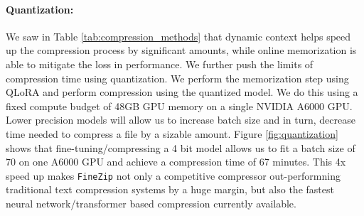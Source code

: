 \documentclass[11pt]{article}
\begin{document}
\paragraph{Quantization:} We saw in Table \ref{tab:compression_methods} that dynamic context helps speed up the compression process by significant amounts, while online memorization is able to mitigate the loss in performance. We further push the limits of compression time using quantization. We perform the memorization step using QLoRA \cite{dettmers2023qlora} and perform compression using the quantized model. We do this using a fixed compute budget of 48GB GPU memory on a single NVIDIA A6000 GPU. Lower precision models will allow us to increase batch size and in turn, decrease time needed to compress a file by a sizable amount. Figure \ref{fig:quantization} shows that fine-tuning/compressing a 4 bit model allows us to fit a batch size of 70 on one A6000 GPU and achieve a compression time of 67 minutes. This 4x speed up makes \texttt{FineZip} not only a competitive compressor out-performning traditional text compression systems by a huge margin, but also the fastest neural network/transformer based compression currently available.





\end{document}
